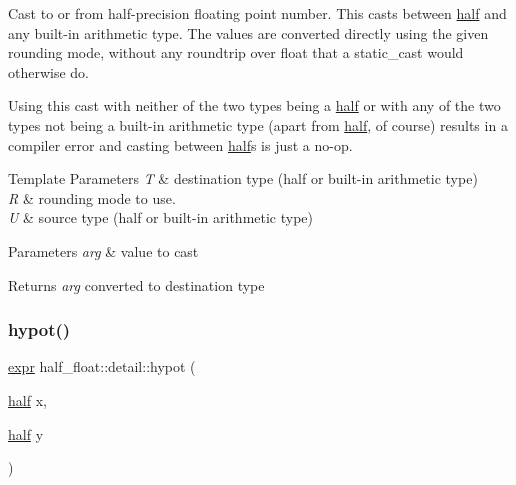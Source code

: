 Cast to or from half-\/precision floating point number. This casts between \hyperlink{classhalf__float_1_1half}{half} and any built-\/in arithmetic type. The values are converted directly using the given rounding mode, without any roundtrip over {\ttfamily float} that a {\ttfamily static\+\_\+cast} would otherwise do.

Using this cast with neither of the two types being a \hyperlink{classhalf__float_1_1half}{half} or with any of the two types not being a built-\/in arithmetic type (apart from \hyperlink{classhalf__float_1_1half}{half}, of course) results in a compiler error and casting between \hyperlink{classhalf__float_1_1half}{half}s is just a no-\/op. 
\begin{DoxyTemplParams}{Template Parameters}
{\em T} & destination type (half or built-\/in arithmetic type) \\
\hline
{\em R} & rounding mode to use. \\
\hline
{\em U} & source type (half or built-\/in arithmetic type) \\
\hline
\end{DoxyTemplParams}

\begin{DoxyParams}{Parameters}
{\em arg} & value to cast \\
\hline
\end{DoxyParams}
\begin{DoxyReturn}{Returns}
{\itshape arg} converted to destination type 
\end{DoxyReturn}
\mbox{\label{namespacehalf__float_1_1detail_a380a4c5a399e3dc14fdf39c53277edc5}} 
\subsubsection{\texorpdfstring{hypot()}{hypot()}\hspace{0.1cm}{\footnotesize\ttfamily [1/4]}}
{\footnotesize\ttfamily \hyperlink{structhalf__float_1_1detail_1_1expr}{expr} half\+\_\+float\+::detail\+::hypot (\begin{DoxyParamCaption}\item[{\hyperlink{classhalf__float_1_1half}{half}}]{x,  }\item[{\hyperlink{classhalf__float_1_1half}{half}}]{y }\end{DoxyParamCaption})\hspace{0.3cm}{\ttfamily [inline]}}


